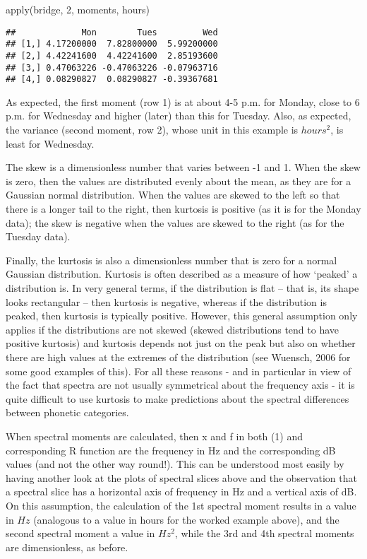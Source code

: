 \documentclass[
]{book}
\newenvironment{Shaded}{\begin{snugshade}}{\end{snugshade}}
\newcommand{\DecValTok}[1]{\textcolor[rgb]{0.00,0.00,0.81}{#1}}
\newcommand{\FunctionTok}[1]{\textcolor[rgb]{0.00,0.00,0.00}{#1}}
\newcommand{\NormalTok}[1]{#1}
\begin{document}
\begin{Shaded}
\begin{Highlighting}[]
\FunctionTok{apply}\NormalTok{(bridge, }\DecValTok{2}\NormalTok{, moments, hours)}
\end{Highlighting}
\end{Shaded}

\begin{verbatim}
##             Mon        Tues         Wed
## [1,] 4.17200000  7.82800000  5.99200000
## [2,] 4.42241600  4.42241600  2.85193600
## [3,] 0.47063226 -0.47063226 -0.07963716
## [4,] 0.08290827  0.08290827 -0.39367681
\end{verbatim}

As expected, the first moment (row 1) is at about 4-5 p.m. for Monday, close to 6 p.m. for Wednesday and higher (later) than this for Tuesday. Also, as expected, the variance (second moment, row 2), whose unit in this example is \(hours^2\), is least for Wednesday.

The skew is a dimensionless number that varies between -1 and 1. When the skew is zero, then the values are distributed evenly about the mean, as they are for a Gaussian normal distribution. When the values are skewed to the left so that there is a longer tail to the right, then kurtosis is positive (as it is for the Monday data); the skew is negative when the values are skewed to the right (as for the Tuesday data).

Finally, the kurtosis is also a dimensionless number that is zero for a normal Gaussian distribution. Kurtosis is often described as a measure of how `peaked' a distribution is. In very general terms, if the distribution is flat -- that is, its shape looks rectangular -- then kurtosis is negative, whereas if the distribution is peaked, then kurtosis is typically positive. However, this general assumption only applies if the distributions are not skewed (skewed distributions tend to have positive kurtosis) and kurtosis depends not just on the peak but also on whether there are high values at the extremes of the distribution (see Wuensch, 2006 for some good examples of this). For all these reasons - and in particular in view of the fact that spectra are not usually symmetrical about the frequency axis - it is quite difficult to use kurtosis to make predictions about the spectral differences between phonetic categories.

When spectral moments are calculated, then x and f in both (1) and corresponding R function are the frequency in Hz and the corresponding dB values (and not the other way round!). This can be understood most easily by having another look at the plots of spectral slices above and the observation that a spectral slice has a horizontal axis of frequency in Hz and a vertical axis of dB. On this assumption, the calculation of the 1st spectral moment results in a value in \(Hz\) (analogous to a value in hours for the worked example above), and the second spectral moment a value in \(Hz^2\), while the 3rd and 4th spectral moments are dimensionless, as before.
\end{document}
